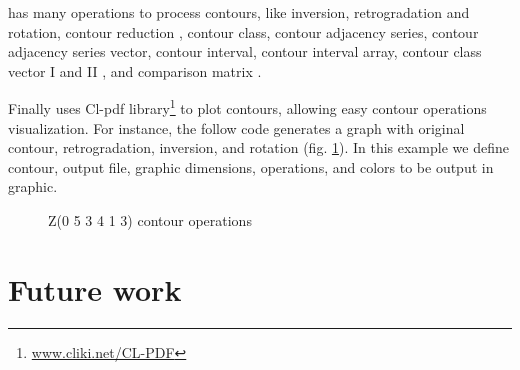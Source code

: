 

\goiaba{} has many operations to process contours, like inversion,
retrogradation and rotation, contour reduction \cite{adams76:melodic},
contour class, contour adjacency series, contour adjacency series
vector, contour interval, contour interval array, contour class vector
I and II \cite{friedmann85:methodology}, and comparison matrix
\cite{morris93:directions}.

Finally \goiaba{} uses Cl-pdf
library\footnote{\url{www.cliki.net/CL-PDF}} to plot contours,
allowing easy contour operations visualization. For instance, the
follow code generates a graph with original contour, retrogradation,
inversion, and rotation (fig. \ref{fig:operacoes}). In this example we
define  contour, output file, graphic dimensions, operations,
and colors to be output in graphic.


\begin{figure}
  \centering
  \caption{Z(0 5 3 4 1 3) contour operations}
  \label{fig:operacoes}
\end{figure}

\section{Future work}
\label{sec:future-work}

